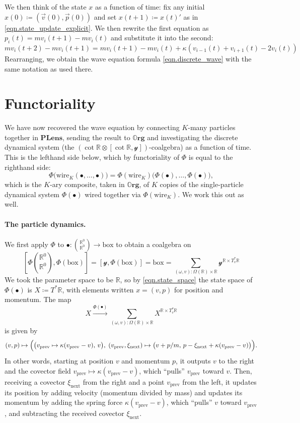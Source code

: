 \documentclass[11pt, oneside, article]{memoir}
\theoremstyle{definition}
\theoremstyle{plain}
\newcommand{\Cat}[1]{\mathbf{#1}}%
\newcommand{\fun}[1]{\mathrm{#1}}%
\newcommand{\To}[2][]{\xrightarrow[#1]{#2}}
\newcommand{\rr}{\mathbb{R}}
\newcommand{\yon}{\mathcal{y}}
\newcommand{\org}{{\mathbb{O}\Cat{rg}}}
\newcommand{\Part}{\bullet}
\newcommand{\boxob}{\mathrm{box}}
\newcommand{\potlens}{\Cat{PLens}}
\begin{document}
We then think of the state $x$ as a function of time: fix any initial $x(0)\coloneqq(\vec{v}(0),\vec{p}(0))$ and set $x(t+1)\coloneqq x(t)'$ as in \eqref{eqn.state_update_explicit}. We then rewrite the first equation as $p_i(t)=mv_i(t+1)-mv_i(t)$ and substitute it into the second:
\[
mv_i(t+2)-mv_i(t+1)=mv_i(t+1)-mv_i(t)+\kappa(v_{i-1}(t)+v_{i+1}(t)-2v_i(t))
\]
Rearranging, we obtain the wave equation formula \eqref{eqn.discrete_wave} with the same notation as used there.

\section{Functoriality}

We have now recovered the wave equation by connecting $K$-many particles together in $\potlens$, sending the result to $\org$ and investigating the discrete dynamical system (the $(\cot{\rr}\otimes[\cot{\rr},\yon])$-coalgebra) as a function of time. This is the lefthand side below, which by functoriality of $\Phi$ is equal to the righthand side:
\[
\Phi\bigl(\fun{wire}_K(\Part,\ldots,\Part)\bigr)=\Phi(\fun{wire}_K)\bigl(\Phi(\Part),\ldots,\Phi(\Part)\bigr),
\]
which is the $K$-ary composite, taken in $\org$, of $K$ copies of the single-particle dynamical system $\Phi(\Part)$ wired together via $\Phi(\fun{wire}_K)$. We work this out as well.

\paragraph{The particle dynamics.}

We first apply $\Phi$ to $\Part\colon\binom{\rr^0}{\rr^0}\to\boxob$ to obtain a coalgebra on
\[
  \left[\Phi\binom{\rr^0}{\rr^0},\Phi(\boxob)\right]=
  \left[\yon,\Phi(\boxob)\right]=\boxob=
  \sum_{(\omega,v):\Omega(\rr)\times\rr}\yon^{\rr\times T^*_v\rr}
\]
We took the parameter space to be $\rr$, so by \eqref{eqn.state_space} the state space of $\Phi(\Part)$ is $X\coloneqq T^*\rr$, with elements written $x=(v,p)$ for position and momentum. The map
\[
X\To{\Phi(\Part)}
\sum_{(\omega,v):\Omega(\rr)\times\rr}X^{\rr\times T^*_v\rr}
\]
is given by
\[
(v,p)\mapsto\Bigl(\bigl(v_{\fun{prev}}\mapsto\kappa(v_{\fun{prev}}-v),\,v\bigr),\;(v_{\fun{prev}},\xi_{\fun{next}})\mapsto\bigl(v+p/m,\,p-\xi_{\fun{next}}+\kappa(v_{\fun{prev}}-v)\bigr)\Bigr).
\]
In other words, starting at position $v$ and momentum $p$, it outputs $v$ to the right and the covector field $v_{\fun{prev}}\mapsto\kappa(v_{\fun{prev}}-v)$, which ``pulls'' $v_{\fun{prev}}$ toward $v$. Then, receiving a covector $\xi_{\fun{next}}$ from the right and a point $v_{\fun{prev}}$ from the left, it updates its position by adding velocity (momentum divided by mass) and updates its momentum by adding the spring force $\kappa(v_{\fun{prev}}-v)$, which ``pulls'' $v$ toward $v_{\fun{prev}}$, and subtracting the received covector $\xi_{\fun{next}}$.
 
\end{document}
